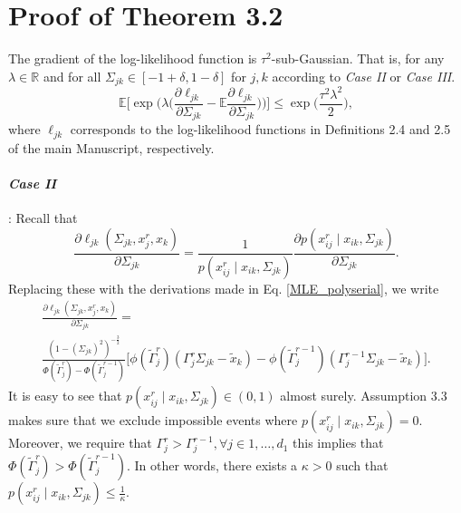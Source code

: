 \section{Proof of Theorem 3.2
 }\label{proof_convergence}

\begin{condition}\label{Gradient statistical noise}
    The gradient of the log-likelihood function is $\tau^2$-sub-Gaussian. That is, for any $\lambda \in \mathbb{R}$ and for all $\Sigma_{jk} \in [-1+\delta, 1-\delta]$ for $j,k$ according to \textit{Case II} or \textit{Case III}.
    \begin{equation}
        \mathbb{E}\Bigg[\exp\Bigg(\lambda \Big(\frac{\partial\ell_{jk}}{\partial \Sigma_{jk}} - \mathbb{E}\frac{\partial\ell_{jk}}{\partial \Sigma_{jk}} \Big) \Bigg)\Bigg] \leq \exp\Big(\frac{\tau^2\lambda^2}{2}\Big),
    \end{equation}
    where $\ell_{jk}$ corresponds to the log-likelihood functions in Definitions 2.4 and 2.5 of the main Manuscript, respectively.
    \paragraph{\textit{Case II}}: Recall that
    \begin{equation*}
        \frac{\partial\ell_{jk}(\Sigma_{jk}, x_j^r,x_k)}{\partial \Sigma_{jk}} = \frac{1}{p(x_{ij}^{r} \mid x_{ik}, \Sigma_{jk})} \frac{\partial p(x_{ij}^{r} \mid x_{ik}, \Sigma_{jk})}{\partial \Sigma_{jk}}.
    \end{equation*}
    Replacing these with the derivations made in Eq. \eqref{MLE_polyserial}, we write
    \begin{multline*}
        \frac{\partial\ell_{jk}(\Sigma_{jk}, x_j^r,x_k)}{\partial \Sigma_{jk}} = \\
        \frac{(1-(\Sigma_{jk})^2)^{-\frac{3}{2}}}{\Phi({\tilde{\Gamma}}_j^{r}) - \Phi({\tilde{\Gamma}}_j^{r-1})} \Bigg[\phi({\tilde{\Gamma}}_j^{r})({\Gamma}_j^r\Sigma_{jk} - {\tilde{x}}_{k}) - \phi({\tilde{\Gamma}}_j^{r-1})({\Gamma}_j^{r-1}\Sigma_{jk} - {\tilde{x}}_{k})\Bigg].
    \end{multline*}
    It is easy to see that $p(x_{ij}^{r} \mid x_{ik}, \Sigma_{jk}) \in (0,1)$ almost surely. Assumption 3.3
    makes sure that we exclude impossible events where $p(x_{ij}^{r} \mid x_{ik}, \Sigma_{jk}) = 0$. Moreover, we require that $\Gamma_j^r > \Gamma_j^{r-1}, \forall j \in 1, \dots, d_1$ this implies that $\Phi({\tilde{\Gamma}}_j^{r}) > \Phi({\tilde{\Gamma}}_j^{r-1})$. In other words, there exists a $\kappa >0$ such that $p(x_{ij}^{r} \mid x_{ik}, \Sigma_{jk}) \leq \frac{1}{\kappa}$.


\end{condition}
